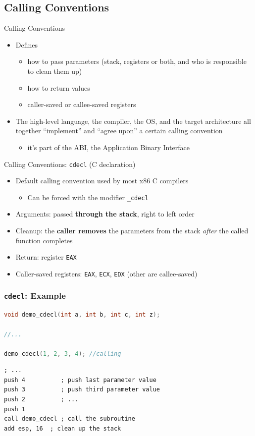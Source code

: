 \documentclass[]{beamer}
\begin{document}
\subsection{Calling Conventions}

\begin{frame}{Calling Conventions}
  \begin{itemize}
  	\item Defines
		\begin{itemize}
		\item how to pass parameters (stack, registers or both, and who is responsible to clean them up)
		\item how to return values
		\item caller-saved or callee-saved registers
		\end{itemize}
	\item The high-level language, the compiler, the OS, and the target architecture all together ``implement'' and ``agree upon'' a certain calling convention
    \begin{itemize}
    	\item it's part of the \alert{ABI}, the Application Binary Interface
    \end{itemize}
 \end{itemize}
\end{frame}


\begin{frame}{Calling Conventions: {\tt cdecl} (C declaration)}
  \begin{itemize}
  \item Default calling convention used by most x86 C compilers
  \begin{itemize}
  	\item Can be forced with the modifier \alert{\tt \_cdecl}
  \end{itemize}
  \item Arguments: passed \textbf{through the stack}, right to left order
  \item Cleanup: the \textbf{caller removes} the parameters from the stack \emph{after} the called function completes
  \item Return: register {\tt EAX}
  \item Caller-saved registers: {\tt EAX}, {\tt ECX}, {\tt EDX} (other are callee-saved)
  \end{itemize}
\end{frame}
\begin{frame}[fragile]
  \frametitle{{\tt cdecl}: Example}
\begin{lstlisting}[language=C]
void demo_cdecl(int a, int b, int c, int z);

//...

demo_cdecl(1, 2, 3, 4); //calling
\end{lstlisting}

\begin{lstlisting}[language={[x86masm]Assembler}]
; ...
push 4          ; push last parameter value
push 3          ; push third parameter value
push 2          ; ...
push 1
call demo_cdecl ; call the subroutine
add esp, 16  ; clean up the stack
\end{lstlisting}

\end{frame}
\end{document}
